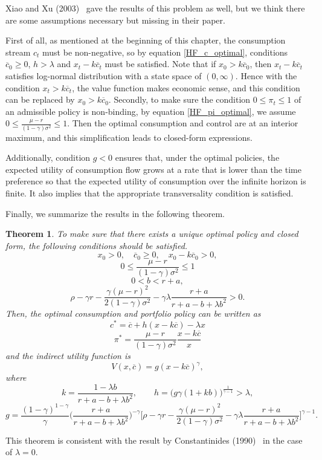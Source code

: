 \documentclass[a4paper]{article}
\newtheorem{theorem}{Theorem}[section]
\theoremstyle{definition}
\numberwithin{equation}{section}
\begin{document}
Xiao and Xu (2003)~\cite{c-i with wealth} gave the results of this problem as well, but we think there are some assumptions necessary but missing in their paper.

First of all, as mentioned at the beginning of this chapter, the consumption stream $c_t$ must be non-negative, so by equation \eqref{HF_c_optimal}, conditions $\overline c_0\geq0$, $h>\lambda$ and $x_t-k\overline c_t$ must be satisfied. Note that if $x_0>k\overline c_0$, then $x_t-k\overline c_t$ satisfies log-normal distribution with a state space of $(0,\infty)$. Hence with the condition $x_t>k\overline c_t$, the value function makes economic sense, and this condition can be replaced by $x_0>k\overline c_0$.
Secondly, to make sure the condition $0\leq\pi_t\leq1$ of an admissible policy is non-binding, by equation \eqref{HF_pi_optimal}, we assume $0\leq\frac{\mu-r}{(1-\gamma)\sigma^2}\leq1$.
Then the optimal consumption and control are at an interior maximum, and this simplification leads to closed-form expressions.

Additionally, condition $g<0$ ensures that, under the optimal policies, the expected utility of consumption flow grows at a rate that is lower than the time preference so that the expected utility of consumption over the infinite horizon is finite. It also implies that the appropriate transversality condition is satisfied.

Finally, we summarize the results in the following theorem.
\begin{theorem}\label{th:wealth}
To make sure that there exists a unique optimal policy and closed form, the following conditions should be satisfied.
$$x_0>0,\quad\overline c_0\geq0,\quad x_0-k\overline c_0>0,$$
$$0\leq\frac{\mu-r}{(1-\gamma)\sigma^2}\leq1$$
$$0<b<r+a,$$
$$\rho-\gamma r-\frac{\gamma(\mu-r)^2}{2(1-\gamma)\sigma^2}-\gamma\lambda\frac{r+a}{r+a-b+\lambda b^2}>0.$$
Then, the optimal consumption and portfolio policy can be written as
$$c^*=\overline c+h(x-k\overline c)-\lambda x$$
$$\pi^*=\frac{\mu-r}{(1-\gamma)\sigma^2}\frac{x-k\overline c}{x}$$
and the indirect utility function is 
$$V(x,\overline c)=g(x-k\overline c)^\gamma,$$
where
$$k=\frac{1-\lambda b}{r+a-b+\lambda b^2},\qquad h=\big(g\gamma(1+kb)\big)^\frac{1}{\gamma-1}>\lambda,$$
$$g=\frac{(1-\gamma)^{1-\gamma}}{\gamma}\Big(\frac{r+a}{r+a-b+\lambda b^2}\Big)^{-\gamma}\Big[\rho-\gamma r-\frac{\gamma(\mu-r)^2}{2(1-\gamma)\sigma^2}-\gamma\lambda\frac{r+a}{r+a-b+\lambda b^2}\Big]^{\gamma-1}.$$
\end{theorem}
This theorem is consistent with the result by Constantinides (1990)~\cite{constantinides} in the case of $\lambda=0$.
\end{document}
